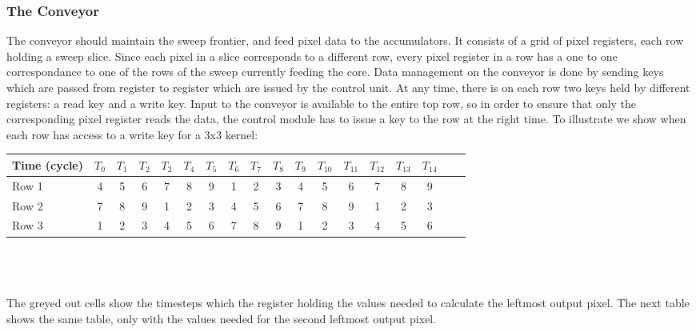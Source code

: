\subsubsection{The Conveyor}
The conveyor should maintain the sweep frontier, and feed pixel data to the accumulators.
It consists of a grid of pixel registers, each row holding a sweep slice.
Since each pixel in a slice corresponds to a different row, every pixel register in a row has a one to one correspondance to one of the rows of the sweep currently feeding the core.
Data management on the conveyor is done by sending keys which are passed from register to register which are issued by the control unit.
At any time, there is on each row two keys held by different registers: a read key and a write key.
Input to the conveyor is available to the entire top row, so in order to ensure that only the corresponding pixel register reads the data, the control module has to issue a key to the row at the right time.
To illustrate we show when each row has access to a write key for a 3x3 kernel:
\\
\begin{tabular}{l*{16}{c}r}
    Time (cycle)        & $T_{0}$ & $T_{1}$ & $T_{2}$ & $T_{2}$ & $T_{4}$  & $T_{5}$ & $T_{6}$ & $T_{7}$ & $T_{8}$ & $T_{9}$ & $T_{10}$ & $T_{11}$ & $T_{12}$ & $T_{13}$ & $T_{14}$\\
\hline
Row 1                   & 4 & 5 & 6 & 7 & 8 & 9 & \cellcolor{gray75} 1 & \cellcolor{gray75} 2 & \cellcolor{gray75} 3 & 4 & 5 & 6 & 7 & 8 & 9 & \\
Row 2                   & 7 & 8 & 9 & \cellcolor{gray75} 1 & \cellcolor{gray75} 2 & \cellcolor{gray75} 3 & 4 & 5 & 6 & 7 & 8 & 9 & \cellcolor{gray75} 1 & \cellcolor{gray75} 2 & \cellcolor{gray75} 3 & \\
Row 3                   & \cellcolor{gray75} 1 & \cellcolor{gray75} 2 & \cellcolor{gray75} 3 & 4 & 5 & 6 & 7 & 8 & 9 & \cellcolor{gray75} 1 & \cellcolor{gray75} 2 & \cellcolor{gray75} 3 & 4 & 5 & 6 & \\
\end{tabular}\\ \\ \\
The greyed out cells show the timesteps which the register holding the values needed to calculate the leftmost output pixel. The next table shows the same table, only with the values needed for the second leftmost output pixel.
\\ \\
